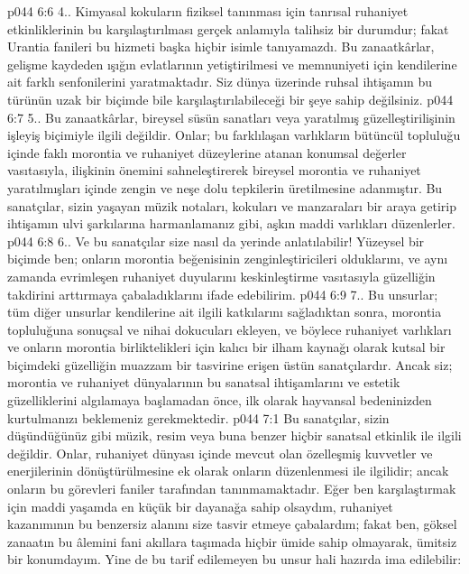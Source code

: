 \vs p044 6:6 4.\bibnobreakspace {}. Kimyasal kokuların fiziksel tanınması için tanrısal ruhaniyet etkinliklerinin bu karşılaştırılması gerçek anlamıyla talihsiz bir durumdur; fakat Urantia fanileri bu hizmeti başka hiçbir isimle tanıyamazdı. Bu zanaatkârlar, gelişme kaydeden ışığın evlatlarının yetiştirilmesi ve memnuniyeti için kendilerine ait farklı senfonilerini yaratmaktadır. Siz dünya üzerinde ruhsal ihtişamın bu türünün uzak bir biçimde bile karşılaştırılabileceği bir şeye sahip değilsiniz.
\vs p044 6:7 5.\bibnobreakspace {}. Bu zanaatkârlar, bireysel süsün sanatları veya yaratılmış güzelleştirilişinin işleyiş biçimiyle ilgili değildir. Onlar; bu farklılaşan varlıkların bütüncül topluluğu içinde faklı morontia ve ruhaniyet düzeylerine atanan konumsal değerler vasıtasıyla, ilişkinin önemini sahneleştirerek bireysel morontia ve ruhaniyet yaratılmışları içinde zengin ve neşe dolu tepkilerin üretilmesine adanmıştır. Bu sanatçılar, sizin yaşayan müzik notaları, kokuları ve manzaraları bir araya getirip ihtişamın ulvi şarkılarına harmanlamanız gibi, aşkın maddi varlıkları düzenlerler.
\vs p044 6:8 6.\bibnobreakspace {}. Ve bu sanatçılar size nasıl da yerinde anlatılabilir! Yüzeysel bir biçimde ben; onların morontia beğenisinin zenginleştiricileri olduklarını, ve aynı zamanda evrimleşen ruhaniyet duyularını keskinleştirme vasıtasıyla güzelliğin takdirini arttırmaya çabaladıklarını ifade edebilirim.
\vs p044 6:9 7.\bibnobreakspace {}. Bu unsurlar; tüm diğer unsurlar kendilerine ait ilgili katkılarını sağladıktan sonra, morontia topluluğuna sonuçsal ve nihai dokucuları ekleyen, ve böylece ruhaniyet varlıkları ve onların morontia birliktelikleri için kalıcı bir ilham kaynağı olarak kutsal bir biçimdeki güzelliğin muazzam bir tasvirine erişen üstün sanatçılardır. Ancak siz; morontia ve ruhaniyet dünyalarının bu sanatsal ihtişamlarını ve estetik güzelliklerini algılamaya başlamadan önce, ilk olarak hayvansal bedeninizden kurtulmanızı beklemeniz gerekmektedir.
\vs p044 7:1 Bu sanatçılar, sizin düşündüğünüz gibi müzik, resim veya buna benzer hiçbir sanatsal etkinlik ile ilgili değildir. Onlar, ruhaniyet dünyası içinde mevcut olan özelleşmiş kuvvetler ve enerjilerinin dönüştürülmesine ek olarak onların düzenlenmesi ile ilgilidir; ancak onların bu görevleri faniler tarafından tanınmamaktadır. Eğer ben karşılaştırmak için maddi yaşamda en küçük bir dayanağa sahip olsaydım, ruhaniyet kazanımının bu benzersiz alanını size tasvir etmeye çabalardım; fakat ben, göksel zanaatın bu âlemini fani akıllara taşımada hiçbir ümide sahip olmayarak, ümitsiz bir konumdayım. Yine de bu tarif edilemeyen bu unsur hali hazırda ima edilebilir:
